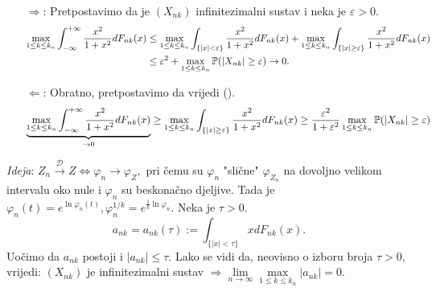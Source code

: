 \documentclass{article}
\begin{document}
\begin{enumerate}
    \item[\(\boxed{\Rightarrow}\):] Pretpostavimo da je \((X_{nk})\) infinitezimalni sustav i neka je \(\varepsilon>0.\) \[\begin{aligned}\max_{1\le k\le k_n}\int_{-\infty}^{+\infty}\frac{x^2}{1+x^2}dF_{nk}(x)&\le\max_{1\le k\le k_n}\int_{\{|x|<\varepsilon\}}\frac{x^2}{1+x^2}dF_{nk}(x)+\max_{1\le k\le k_n}\int_{\{|x|\ge\varepsilon\}}\frac{x^2}{1+x^2}dF_{nk}(x)\\&\le\varepsilon^2+\max_{1\le k\le k_n}\Bbb P(|X_{nk}|\ge\varepsilon)\to 0.\end{aligned}\] 
    \item[\(\boxed{\Leftarrow}\):] Obratno, pretpostavimo da vrijedi (). \[\underbrace{\max_{1\le k\le k_n}\int_{-\infty}^{+\infty}\frac{x^2}{1+x^2}dF_{nk}(x)}_{\to0}\ge\max_{1\le k\le k_n}\int_{\{|x|\ge\varepsilon\}}\frac{x^2}{1+x^2}dF_{nk}(x)\ge\frac{\varepsilon^2}{1+\varepsilon^2}\max_{1\le k\le k_n}\Bbb P(|X_{nk}|\ge\varepsilon)\]
\end{enumerate}
\textit{Ideja}: \(Z_n\overset{\mathcal D}{\longrightarrow}Z\Leftrightarrow\varphi_n\to\varphi_Z,\) pri čemu su \(\varphi_n\) "slične" \(\varphi_{Z_n}\) na dovoljno velikom intervalu oko nule i \(\varphi_n\) su beskonačno djeljive. Tada je \(\varphi_n(t)=e^{\ln\varphi_n(t)},\varphi_n^{1/k}=e^{\frac1k\ln\varphi_n}.\) Neka je \(\tau>0.\) \[a_{nk}=a_{nk}(\tau):=\int_{\{|x|<\tau\}}xdF_{nk}(x).\] Uočimo da \(a_{nk}\) postoji i \(|a_{nk}|\le\tau.\) Lako se vidi da, neovisno o izboru broja \(\tau>0,\) vrijedi: \((X_{nk})\) je infinitezimalni sustav \(\Rightarrow\lim\limits_{n\to\infty}\max\limits_{1\le k\le k_n}|a_{nk}|=0.\)\newline\newline
\end{document}
